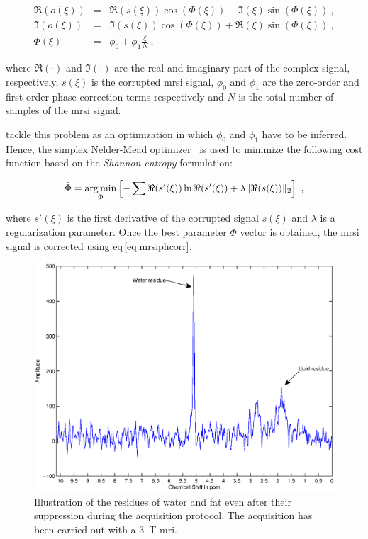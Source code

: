 \begin{eqnarray}
	\Re(o(\xi)) & = & \Re(s(\xi))\cos(\Phi(\xi)) - \Im(\xi)\sin(\Phi(\xi)) \ , \nonumber  \\
	\Im(o(\xi)) & = & \Im(s(\xi))\cos(\Phi(\xi)) + \Re(\xi)\sin(\Phi(\xi)) \ , \nonumber \\
	\Phi(\xi) & = & \phi_0 + \phi_1 \frac{\xi}{N} \ , \label{eq:mrsiphcorr}
\end{eqnarray}

\noindent where $\Re(\cdot)$ and $\Im(\cdot)$ are the real and imaginary part of the complex signal, respectively, $s(\xi)$ is the corrupted \ac{mrsi} signal, $\phi_0$ and $\phi_1$ are the zero-order and first-order phase correction terms respectively and $N$ is the total number of samples of the \ac{mrsi} signal.

\citeauthor{Chen2002} tackle this problem as an optimization in which $\phi_0$ and $\phi_1$ have to be inferred.
Hence, the simplex Nelder-Mead optimizer~\cite{Nelder1965} is used to minimize the following cost function based on the \textit{Shannon entropy} formulation:

\begin{equation}
	\hat{\Phi} = \argmin_{\Phi} \left[ - \sum \Re(s'(\xi)) \ln \Re(s'(\xi)) + \lambda \|\Re(s(\xi))\|_2 \right] \ ,
	\label{eq:phcost}
\end{equation}

\noindent where $s'(\xi)$ is the first derivative of the corrupted signal $s(\xi)$ and $\lambda$ is a regularization parameter.
Once the best parameter $\Phi$ vector is obtained, the \ac{mrsi} signal is corrected using \acs{eq}\,\eqref{eq:mrsiphcorr}.

\begin{figure}
\centering
\includegraphics[width=0.7\linewidth]{3_review/figures/processing/pre-processing/water/water_fat.eps}
\caption[Illustration of water and fat residues in \ac{mrsi} signal after suppression during acquisition.]{Illustration of the residues of water and fat even after their suppression during the acquisition protocol. The acquisition has been carried out with a \SI{3}{\tesla} \ac{mri}.}
\label{fig:waterfat}
\end{figure}

